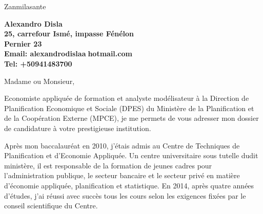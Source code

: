 \documentclass[11pt]{letter} %
\begin{document}

\begin{letter}{Zanmilasante} 


\begin{center}
\large\bf Alexandro Disla\\ %
25, carrefour Ism\'{e}, impasse F\'{e}n\'{e}lon\\ Pernier 23 \\ %
Email: alexandrodisla\textcircled{a}hotmail.com \\
Tel: +50941483700
\end{center} 
\vfill

\signature{Alexandro Disla} %


\opening{Madame ou Monsieur,} 


	Economiste appliquée de formation et analyste modélisateur à la Direction de Planification Economique et Sociale (DPES) du Ministère de la Planification et de la Coopération Externe (MPCE), je me permets de vous adresser mon dossier de candidature à votre prestigieuse institution.
	
	Après mon baccalauréat en 2010, j’étais admis au Centre de Techniques de Planification et d’Economie Appliquée. Un centre universitaire sous tutelle dudit ministère, il est responsable de la formation de jeunes cadres pour l’administration publique, le secteur bancaire et le secteur privé en matière d’économie appliquée, planification et statistique. En 2014, après quatre années d’études, j’ai réussi avec succès tous les cours selon les exigences fixées par le conseil scientifique du Centre.
	

\end{letter}
\end{document}
